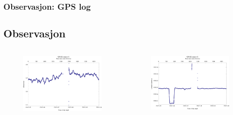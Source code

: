 \documentclass[xcolor=table]{beamer}
\begin{document}
\begin{frame}
\frametitle{Observasjon: GPS log}
  \subsection{Observasjon}
    \vspace{-40pt}
    \begin{columns}
      \begin{figure}
        \includegraphics[scale=0.40]{thesis/graphics/gnssAlt1-1.png}
      \end{figure}
      \vspace{-30pt}
      \begin{figure}
        \includegraphics[scale=0.40]{thesis/graphics/gnssLat1-1.png}
      \end{figure}

\end{columns}
\end{frame}
\end{document}
